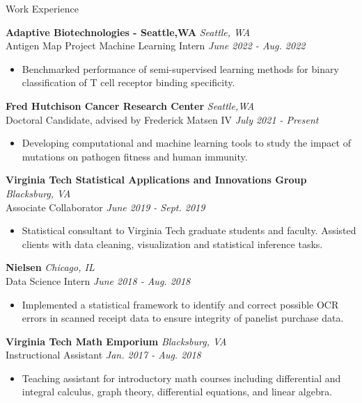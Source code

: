 \documentclass{resume} %
\begin{document}
\begin{rSection}{Work Experience}

{\bf Adaptive Biotechnologies - Seattle,WA} \hfill {\em Seattle, WA}\\
{Antigen Map Project Machine Learning Intern} \hfill {\em June 2022 - Aug. 2022}
\begin{itemize}
    \item Benchmarked performance of semi-supervised learning methods for binary classification of T cell receptor binding specificity.
\end{itemize}

{\bf Fred Hutchison Cancer Research Center} \hfill { \em Seattle,WA}\\
{Doctoral Candidate, advised by Frederick Matsen IV} \hfill {\em July 2021 - Present}
\begin{itemize}
    \item Developing computational and machine learning tools to study the impact of mutations on pathogen fitness and human immunity.
\end{itemize}

{\bf Virginia Tech Statistical Applications and Innovations Group} \hfill {\em Blacksburg, VA} \\
{Associate Collaborator} \hfill {\em June 2019 - Sept. 2019}
\begin{itemize}
    \item Statistical consultant to Virginia Tech graduate students and faculty.
    Assisted clients with data cleaning, visualization and statistical inference tasks.
\end{itemize}

{\bf Nielsen} \hfill {\em Chicago, IL} \\
{Data Science Intern} \hfill {\em June 2018 - Aug. 2018}
\begin{itemize}
    \item Implemented a statistical framework to identify and correct possible OCR errors in scanned receipt data to ensure integrity of panelist purchase data.
\end{itemize}

{\bf Virginia Tech Math Emporium} \hfill {\em Blacksburg, VA} \\
{Instructional Assistant} \hfill {\em Jan. 2017 - Aug. 2018}
\begin{itemize}
    \item Teaching assistant for introductory math courses including differential and integral calculus, graph theory, differential equations, and linear algebra.
\end{itemize}
\end{rSection}
\end{document}
